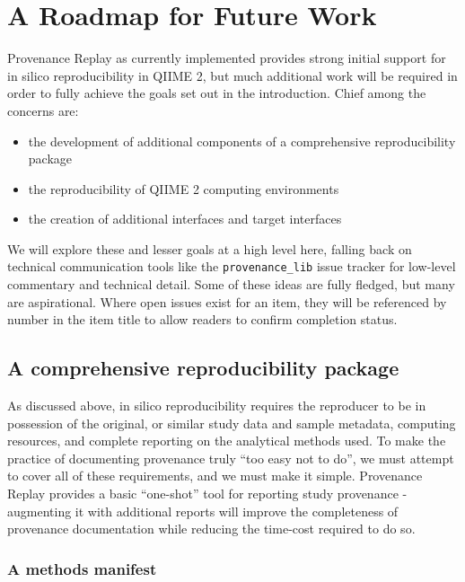 \chapter{A Roadmap for Future Work}
\label{chapter:future_work}

Provenance Replay as currently implemented provides strong initial support for
in silico reproducibility in QIIME 2, but much additional work will be required
in order to fully achieve the goals set out in the introduction. Chief among the
concerns are:

\begin{itemize}
    \item the development of additional components of a comprehensive reproducibility package
    \item the reproducibility of QIIME 2 computing environments
    \item the creation of additional interfaces and target interfaces
\end{itemize}

We will explore these and lesser goals at a high level here, falling back on
technical communication tools like the \texttt{provenance\_lib} issue tracker
\parencite{keefe_issues_2021} for low-level commentary and technical detail.
Some of these ideas are fully fledged, but many are aspirational. Where open
issues exist for an item, they will be referenced by number in the item title to
allow readers to confirm completion status.

\section{A comprehensive reproducibility package}

As discussed above, in silico reproducibility requires the reproducer to be in
possession of the original, or similar study data and sample metadata, computing
resources, and complete reporting on the analytical methods used. To make the
practice of documenting provenance truly “too easy not to do”, we must attempt
to cover all of these requirements, and we must make it simple. Provenance
Replay provides a basic “one-shot” tool for reporting study provenance -
augmenting it with additional reports will improve the completeness of
provenance documentation while reducing the time-cost required to do so.

\subsection{A methods manifest \parencite[Issue 75]{keefe_issues_2021}}
\label{methods_manifest}

